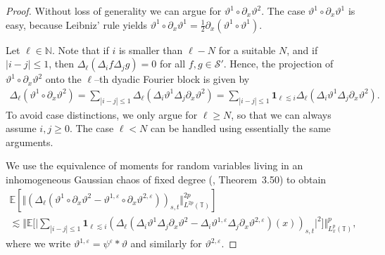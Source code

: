 \documentclass[a4paper,11pt]{article}
\theoremstyle{remark}
\newcommand{\N}{\mathbb{N}}
\newcommand{\E}{\mathbb{E}}
\newcommand{\CS}{\ensuremath{\mathscr{S}}}
\newcommand{\reso}{\,\mathord{\circ}\,}
\begin{document}
\begin{proof}
   Without loss of generality we can argue for $\vartheta^1 \reso \partial_x \vartheta^2$. The case $\vartheta^1 \reso \partial_x \vartheta^1$ is easy, because Leibniz' rule yields $\vartheta^1 \reso \partial_x \vartheta^1 = \frac{1}{2} \partial_x(\vartheta^1 \reso \vartheta^1)$.
  
   Let $\ell \in \N$. Note that if $i$ is smaller than $\ell - N$ for a suitable $N$, and if $| i - j | \leqslant 1$, then $\Delta_{\ell}(\Delta_i f \Delta_j g) = 0$ for all $f, g \in \CS'$. Hence, the projection of $\vartheta^1\reso \partial_x\vartheta^2$ onto the $\ell$--th dyadic Fourier block is given by
   \begin{align*}
      \Delta_{\ell} (\vartheta^1\reso \partial_x \vartheta^2 ) = \sum_{| i- j | \leqslant 1} \Delta_{\ell}(\Delta_i \vartheta^1 \Delta_j\partial_x \vartheta^2) = \sum_{|i-j|\leqslant 1} \mathbf{1}_{\ell \lesssim i} \Delta_{\ell} (\Delta_i \vartheta^1 \Delta_j \partial_x \vartheta^2).
   \end{align*}
   To avoid case distinctions, we only argue for $\ell \geqslant N$, so that we can always assume $i, j  \geqslant 0$. The case $\ell < N$ can be handled using essentially the same arguments.
      
   We use the equivalence of moments for random variables living in an inhomogeneous Gaussian chaos of fixed degree (\cite{Janson1997}, Theorem~3.50) to obtain
   \begin{gather} \nonumber
      \E [\Vert  (\Delta_{\ell} ( \vartheta^1\reso \partial_x \vartheta^2 - \vartheta^{1,\varepsilon} \reso \partial_x \vartheta^{2,\varepsilon}) )_{s,t} \Vert_{L^{2 p}(\mathbb{T})}^{2 p}] \\ \label{eq:burgers area hypercontractivity}
      \lesssim \biggl\Vert  \E\biggl[\biggl| \sum_{|i-j| \leqslant 1} \mathbf{1}_{\ell \lesssim i} ( \Delta_{\ell} ( \Delta_i \vartheta^1 \Delta_j \partial_x \vartheta^2 -  \Delta_i \vartheta^{1,\varepsilon} \Delta_j \partial_x \vartheta^{2,\varepsilon} )(x))_{s,t}\biggr|^2\biggr] \biggr\Vert_{L^p_x(\mathbb{T})}^p,
   \end{gather}
   where we write $\vartheta^{1, \varepsilon} = \psi^\varepsilon \ast \vartheta$ and similarly for $\vartheta^{2, \varepsilon}$. 
   

\end{proof}
\end{document}
